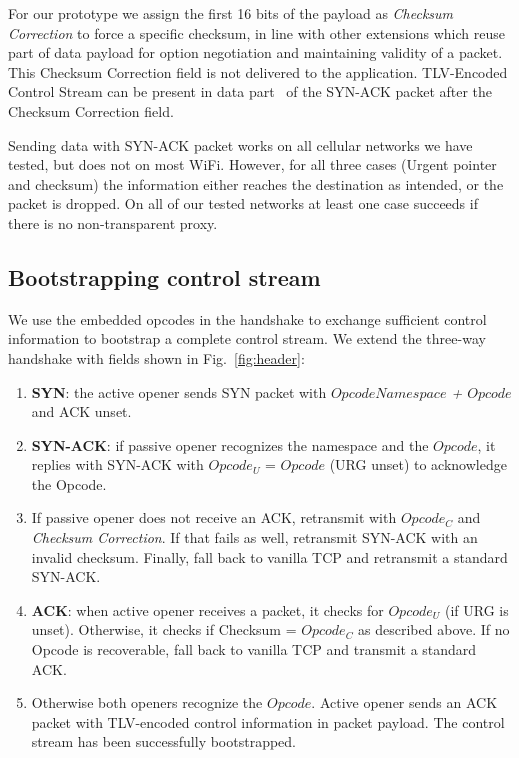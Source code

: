 \documentclass{sig-alternate-10pt}
\begin{document}
For our prototype we assign the first 16 bits of the payload as \emph{Checksum Correction} to force a specific checksum, in line with other extensions which reuse part of data payload for option negotiation and maintaining validity of a packet. This Checksum Correction field is not delivered to the application. TLV-Encoded Control Stream can be present in data part~\cite{Bonaventure:wx} of the SYN-ACK packet after the Checksum Correction field.

Sending data with SYN-ACK packet works on all cellular networks we have tested, but does not on most WiFi. However, for all three cases (Urgent pointer and checksum) the information either reaches the destination as intended, or the packet is dropped. On all of our tested networks at least one case succeeds if there is no non-transparent proxy.

\subsection{Bootstrapping control stream}

We use the embedded opcodes in the handshake to exchange sufficient control information to bootstrap a complete control stream. We extend the three-way handshake with fields shown in Fig.~\ref{fig:header}:

\begin{enumerate}
\item \textbf{SYN}: the active opener sends SYN packet with \emph{$Opcode Namespace$ + $Opcode$} and ACK unset.
\item \textbf{SYN-ACK}: if passive opener recognizes the namespace and the $Opcode$, it replies with SYN-ACK with $Opcode_U$ = $Opcode$ (URG unset) to acknowledge the Opcode.
\item If passive opener does not receive an ACK, retransmit with $Opcode_C$ and \emph{Checksum Correction}. If that fails as well, retransmit SYN-ACK with an invalid checksum. Finally, fall back to vanilla TCP and retransmit a standard SYN-ACK.
\item \textbf{ACK}: when active opener receives a packet, it checks for $Opcode_U$ (if URG is unset). Otherwise, it checks if Checksum = $Opcode_C$ as described above. If no Opcode is recoverable, fall back to vanilla TCP and transmit a standard ACK.
\item Otherwise both openers recognize the $Opcode$. Active opener sends an ACK packet with TLV-encoded control information in packet payload. The control stream has been successfully bootstrapped.
\end{enumerate}
\end{document}
